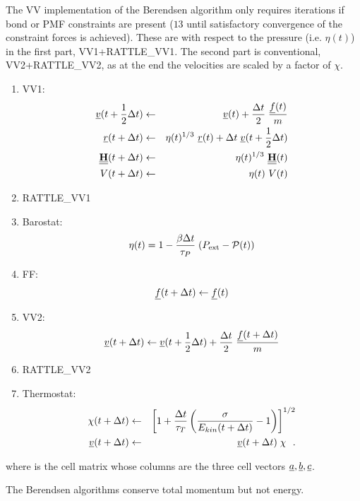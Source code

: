 The VV implementation of the Berendsen algorithm only requires iterations
if bond or PMF constraints are present ($13$ until satisfactory
convergence of the constraint forces is achieved).  These are
with respect to the pressure (i.e. $\eta (t)$) in the first part,
VV1+RATTLE\_VV1.  The second part is conventional, VV2+RATTLE\_VV2,
as at the end the velocities are scaled by a factor of $\chi$.
\begin{enumerate}
\item VV1:
\begin{eqnarray}
\mbox{$\underline{v}$}(t + {1 \over 2} \Delta t) &\leftarrow& \mbox{$\underline{v}$}(t) +
{\Delta t \over 2} \; {\mbox{$\underline{f}$}(t) \over m} \nonumber \\
\mbox{$\underline{r}$}(t + \Delta t) &\leftarrow& \eta (t)^{1/3}~\mbox{$\underline{r}$}(t) + \Delta t \;
\mbox{$\underline{v}$}(t + {1 \over 2} \Delta t) \\
\mbox{$\underline{\underline{\bf H}}$}(t + \Delta t) &\leftarrow&  \eta (t)^{1/3}~\mbox{$\underline{\underline{\bf H}}$}(t) \nonumber \\
V(t + \Delta t) &\leftarrow& \eta (t)~V(t) \nonumber
\end{eqnarray}
\item RATTLE\_VV1
\item Barostat:
\begin{equation}
\eta (t) = 1 - {\beta \Delta t \over \tau_{P}} \; (P_{\rm ext} -
{\cal P}(t))
\end{equation}
\item FF:
\begin{equation}
\mbox{$\underline{f}$}(t + \Delta t) \leftarrow \mbox{$\underline{f}$}(t)
\end{equation}
\item VV2:
\begin{equation}
\mbox{$\underline{v}$}(t + \Delta t) \leftarrow \mbox{$\underline{v}$}(t + {1 \over 2} \Delta t) +
{\Delta t \over 2} \; {\mbox{$\underline{f}$}(t + \Delta t) \over m}
\end{equation}
\item RATTLE\_VV2
\item Thermostat:
\begin{eqnarray}
\chi (t + \Delta t) &\leftarrow& \left[ 1 + {\Delta t \over \tau_{T}}
\left( {\sigma \over E_{kin}(t + \Delta t)} - 1 \right) \right]^{1/2} \nonumber \\
\mbox{$\underline{v}$}(t + \Delta t) &\leftarrow& \mbox{$\underline{v}$}(t + \Delta t) \; \chi~~.
\end{eqnarray}
\end{enumerate}
where  is the cell matrix whose columns are the three cell
vectors $\mbox{$\underline{a}$}, \mbox{$\underline{b}$}, \mbox{$\underline{c}$}$.

The Berendsen algorithms conserve total momentum but not energy.

